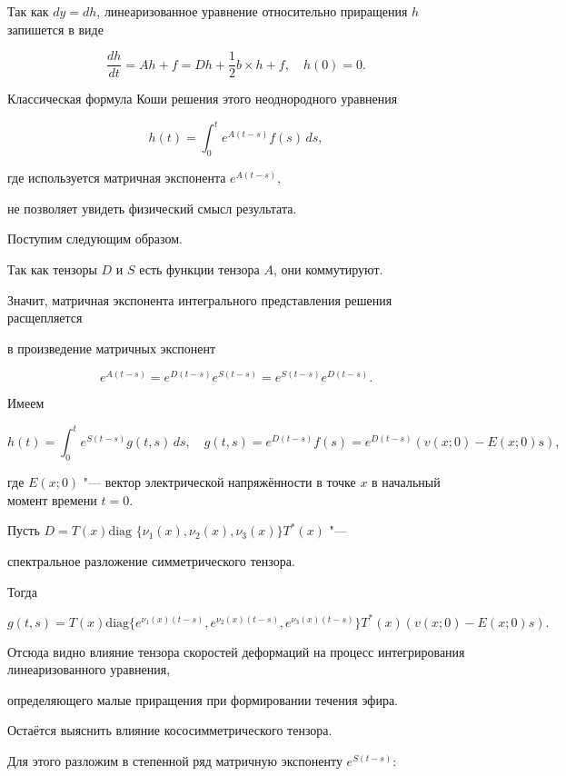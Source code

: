 Так как $dy = dh$, линеаризованное уравнение относительно приращения $h$ запишется в виде 

$$

\frac{dh}{dt} = Ah + f = Dh + \frac{1}{2}b\times h + f,\quad h(0) = 0.

$$ 

Классическая формула Коши решения этого неоднородного уравнения

$$\displaystyle h(t) = \int_0^te^{A(t-s)}f(s)\,ds ,$$ 

где используется матричная экспонента $e^{A(t-s)}$, 

не позволяет увидеть физический смысл результата. 



Поступим следующим образом. 

Так как тензоры  $D$ и $S$ есть функции тензора $A$, они коммутируют. 

Значит, матричная экспонента интегрального представления решения расщепляется 

в произведение матричных экспонент 

$$\displaystyle e^{A(t-s)} = e^{D(t-s)}e^{S(t-s)} = e^{S(t-s)}e^{D(t-s)}.$$ 

Имеем

$$

h(t) = \int_0^te^{S(t-s)}g(t,s)\,ds ,\quad g(t,s) = e^{D(t-s)}f(s) = e^{D(t-s)}(v(x;0) - E(x;0)s),

$$

где $E(x;0)$ "--- вектор электрической напряжённости в точке $x$ в начальный момент времени $t = 0$. 



Пусть $D = T(x)\text{diag }\{\nu_1(x),\nu_2(x),\nu_3(x)\}T^*(x)$ "---

 спектральное разложение симметрического тензора. 

Тогда 

$$

g(t,s) = T(x)\text{diag}\{e^{\nu_1(x)(t-s)},e^{\nu_2(x)(t-s)},e^{\nu_3(x)(t-s)}\}T^*(x)(v(x;0) - E(x;0)s).

$$ 

Отсюда видно влияние тензора скоростей деформаций на процесс интегрирования линеаризованного уравнения, 

определяющего малые приращения при формировании течения эфира. 



Остаётся выяснить влияние кососимметрического тензора. 

Для этого разложим в степенной ряд матричную экспоненту $e^{S(t-s)}$:


